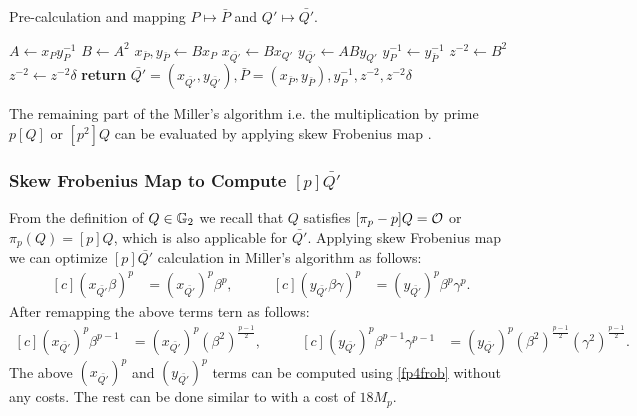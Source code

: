 \begin{algorithm}[!htp]
	\caption{Pre-calculation and mapping $P \mapsto\bar{P}$ and $Q'\mapsto \bar{Q'}$.}
	\label{pre_calc_Algo_cvma_kss16}
	\DontPrintSemicolon
	
	
	
	 $A \leftarrow x_Py_P^{-1}$ 
	 $B \leftarrow A^{2}$  
	 $x_{\bar{P}}, y_{\bar{P}} \leftarrow Bx_P$  
	 $x_{\bar{Q'}} \leftarrow Bx_{Q'}$ 
	 $y_{\bar{Q'}} \leftarrow ABy_{Q'}$ 
	 $y_P^{-1} \leftarrow y_{\bar{P}}^{-1}$ 
	 $z^{-2} \leftarrow B^2$ 
	 $z^{-2} \leftarrow z^{-2}\delta$  
	 {\bf return} $\bar{Q'}=(x_{\bar{Q'}},y_{\bar{Q'}}),\bar{P} = (x_{\bar{P}}, y_{\bar{P}}), y_{P}^{-1}, z^{-2},  z^{-2}\delta $\;
\end{algorithm}
\vspace{8mm}
The remaining part of the Miller's algorithm i.e. the multiplication by prime $p[Q]$ or $[p^2]Q$ can be evaluated by applying skew Frobenius map  \cite{CANS:SNOKM08}.
\subsubsection{Skew Frobenius Map to Compute \texorpdfstring{$[p]\bar{Q'}$}{}}\label{sec:skew_fm_cvmakss16}
From the definition of $Q \in {\mathbb{G}}_{2}$ we recall that $Q$ satisfies $[\pi_p -p]Q = \cal O$ or $\pi_p(Q) = [p]Q$, which is also applicable for $\bar{Q'}$.
Applying skew Frobenius map we can optimize $[p]\bar{Q'}$ calculation in Miller's algorithm as follows:
\begin{equation*}
\begin{aligned}[c]
(x_{\bar{Q'}}\beta)^p  &=  (x_{\bar{Q'}})^p \beta^p, \nonumber
\end{aligned}
\qquad
\begin{aligned}[c]
(y_{\bar{Q'}}\beta\gamma )^p  &=   (y_{\bar{Q'}})^p \beta^p \gamma^p.  \nonumber 
\end{aligned}
\end{equation*}
After remapping the above terms tern as follows:
\begin{equation*}
\begin{aligned}[c]
(x_{\bar{Q'}})^p \beta^{p-1} & =   (x_{\bar{Q'}})^p (\beta^2)^{\frac{p-1}{2}},
\end{aligned}
\qquad
\begin{aligned}[c]
 (y_{\bar{Q'}})^p \beta^{p-1} \gamma^{p-1}  & = (y_{\bar{Q'}})^p (\beta^2)^{\frac{p-1}{2}} (\gamma^2)^{\frac{p-1}{2}}.
\end{aligned}
\end{equation*}
The above $(x_{\bar{Q'}})^p$ and $(y_{\bar{Q'}})^p$ terms can be computed using \eqref{fp4frob} without any costs.
The rest can be done similar to  with a cost of $18M_p$.

